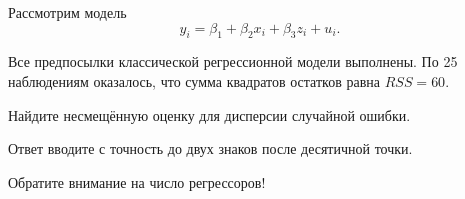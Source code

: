 
\begin{question}
Рассмотрим модель
\[
y_i = \beta_1 + \beta_2 x_i + \beta_3 z_i + u_i.
\]

Все предпосылки классической регрессионной модели выполнены.
По 25 наблюдениям оказалось, что сумма квадратов остатков равна \(RSS = 60\).

Найдите несмещённую оценку для дисперсии случайной ошибки.

Ответ вводите с точность до двух знаков после десятичной точки.
\end{question}

\begin{solution}
Обратите внимание на число регрессоров!
\end{solution}

